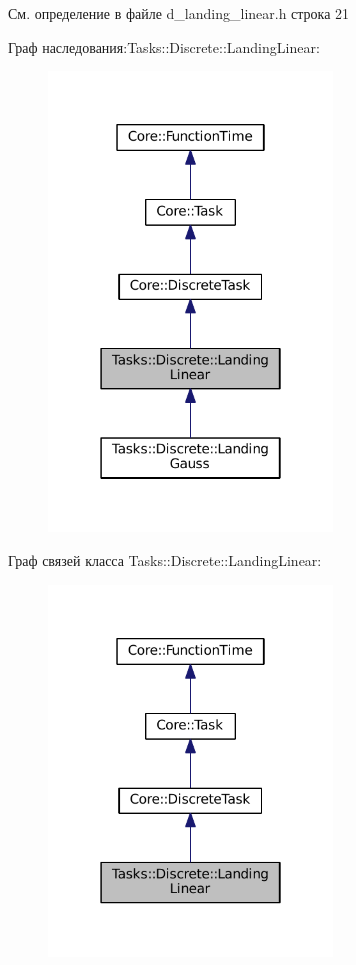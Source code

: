См. определение в файле d\+\_\+landing\+\_\+linear.\+h строка 21



Граф наследования\+:Tasks\+:\+:Discrete\+:\+:Landing\+Linear\+:\nopagebreak
\begin{figure}[H]
\begin{center}
\leavevmode
\includegraphics[width=214pt]{class_tasks_1_1_discrete_1_1_landing_linear__inherit__graph}
\end{center}
\end{figure}


Граф связей класса Tasks\+:\+:Discrete\+:\+:Landing\+Linear\+:\nopagebreak
\begin{figure}[H]
\begin{center}
\leavevmode
\includegraphics[width=214pt]{class_tasks_1_1_discrete_1_1_landing_linear__coll__graph}
\end{center}
\end{figure}


